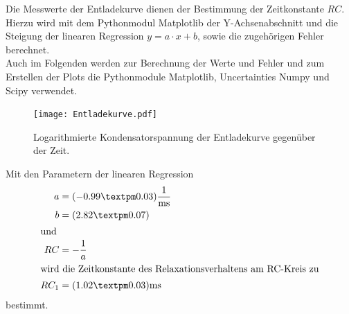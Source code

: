\noindent Die Messwerte der Entladekurve dienen der Bestimmung der Zeitkonstante $RC$.  
Hierzu wird mit dem Pythonmodul Matplotlib \cite{matplotlib} der Y-Achsenabschnitt und die Steigung der linearen Regression $y = a \cdot x + b$, 
sowie die zugehörigen Fehler berechnet.\\
Auch im Folgenden werden zur Berechnung der Werte und Fehler und zum Erstellen der Plots die Pythonmodule Matplotlib, Uncertainties \cite{uncertainties}
Numpy \cite{numpy} und Scipy \cite{scipy} verwendet.
\begin{figure}[H]
  \centering
  \texttt{[image: Entladekurve.pdf]}
  \caption{Logarithmierte Kondensatorspannung der Entladekurve gegenüber der Zeit.}
  \label{fig:Entladekurve_plot}
\end{figure}
\noindent Mit den Parametern der linearen Regression
\begin{align*}
a &= (-0.99 ± 0.03)\si{\milli\second\tothe{-1}} \\
b &= (2.82 ± 0.07)\\
\shortintertext{und}
RC&= - \frac{1}{a}\\
\intertext{wird die Zeitkonstante des Relaxationsverhaltens am RC-Kreis zu}
RC_1&=(1.02 ± 0.03)\si{\milli\second}
\end{align*}
bestimmt.



